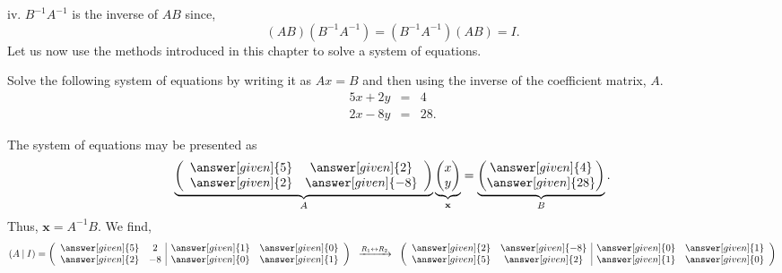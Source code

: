 \documentclass{ximera}
\begin{document}
iv. $B^{-1}A^{-1}$ is the inverse of $AB$ since,
\begin{equation*}
(AB)\left(B^{-1}A^{-1}\right) =  \left(B^{-1}A^{-1}\right)(AB) = I.
\end{equation*}
Let us now use the methods introduced in this chapter to solve a system of equations.
\begin{example}
Solve the following system of equations by writing it as $Ax=B$ and then using the inverse of the coefficient matrix, $A$.
\begin{eqnarray*}
5x+2y &=& 4\\
2x-8y&=& 28.
\end{eqnarray*}

\begin{prompt}
The system of equations may be presented as
\begin{equation}
\underbrace{\left(\begin{array}{cc}
  \answer[given]{5} &  \answer[given]{2} \\
  \answer[given]{2} &  \answer[given]{-8}
\end{array}\right)}_{A}\underbrace{\begin{pmatrix}
  x \\
  y
\end{pmatrix}}_{\textbf{x}}= \underbrace{\begin{pmatrix}
  \answer[given]{4} \\
  \answer[given]{28}
\end{pmatrix}}_{B}.
\end{equation}
Thus, $\textbf{x}= A^{-1}B$. We find,
\[
\left(A \hspace{.08cm}|\hspace{.08cm} I\right) = \left(\begin{array}{cc|cc}
  \answer[given]{5} &  2 & \answer[given]{1} & \answer[given]{0}  \\
  \answer[given]{2} &  -8 & \answer[given]{0} & \answer[given]{1}  \\
\end{array}\right)
\hspace{.2cm}\xrightarrow{R_{1}\leftrightarrow R_{2}} \hspace{.2cm}
\left(\begin{array}{cc|cc}
  \answer[given]{2} &  \answer[given]{-8} & \answer[given]{0} & \answer[given]{1}  \\
  \answer[given]{5} &  \answer[given]{2} & \answer[given]{1} & \answer[given]{0}  \\
\end{array}\right)
\]
\end{prompt}
\end{example}
\end{document}
